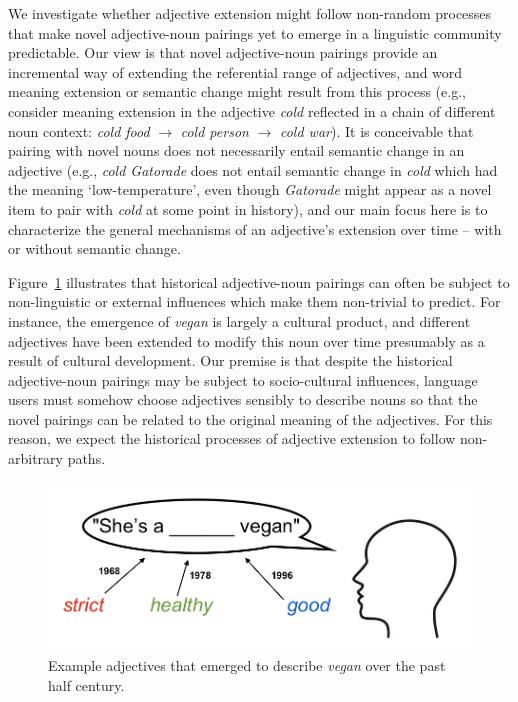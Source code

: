 \documentclass[output=paper]{langsci/langscibook}
\begin{document}
We investigate whether adjective extension might follow non-random processes that make novel adjective-noun pairings yet to emerge in a linguistic community predictable. Our view is that novel adjective-noun pairings provide an incremental way of extending the referential range of adjectives, and word meaning extension or  semantic change might result from this process (e.g., consider meaning extension in the adjective \textit{cold} reflected in a chain of different noun context: \textit{cold food} $\rightarrow$ \textit{cold person} $\rightarrow$ \textit{cold war}). It is conceivable that pairing with novel nouns does not necessarily entail semantic change in an adjective (e.g., \textit{cold Gatorade} does not entail semantic change in \textit{cold} which had the meaning `low-temperature', even though \textit{Gatorade} might appear as a novel item to pair with \textit{cold} at some point in history), and our main focus here is to characterize the general mechanisms of an adjective's extension over time -- with or without  semantic change. 

Figure~\ref{fig:intro} illustrates that historical adjective-noun pairings can often be subject to non-linguistic or external influences which make them non-trivial to predict. For instance, the emergence of {\it vegan} is largely a cultural product, and different adjectives have been extended to modify this noun over time presumably as a result of cultural development. Our premise is that despite the historical  adjective-noun pairings may be subject to socio-cultural influences, language users must somehow choose adjectives  sensibly to describe nouns so that the novel pairings can be related to the original meaning of the adjectives. For this reason, we expect the historical processes of adjective extension to follow non-arbitrary paths.  


\begin{figure}[t!]
\begin{center} 
\includegraphics[width=4.5in]{figures/GREWAL_intro.png}
\end{center}
\caption{Example adjectives that emerged to describe {\it vegan} over the past half century.} 
\label{fig:intro}
\end{figure}
\end{document}
